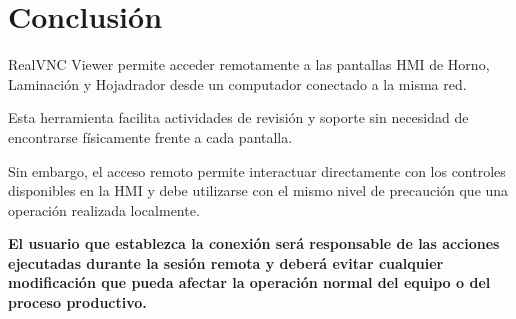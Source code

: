 \documentclass[11pt,a4paper]{article}
\begin{document}

\section{Conclusión}

RealVNC Viewer permite acceder remotamente a las pantallas HMI de Horno,
Laminación y Hojadrador desde un computador conectado a la misma red.

Esta herramienta facilita actividades de revisión y soporte sin necesidad
de encontrarse físicamente frente a cada pantalla.

Sin embargo, el acceso remoto permite interactuar directamente con los
controles disponibles en la HMI y debe utilizarse con el mismo nivel de
precaución que una operación realizada localmente.

\textbf{El usuario que establezca la conexión será responsable de las
acciones ejecutadas durante la sesión remota y deberá evitar cualquier
modificación que pueda afectar la operación normal del equipo o del
proceso productivo.}
\end{document}
